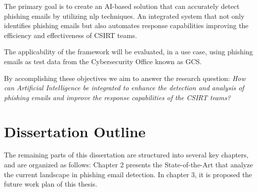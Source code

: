 The primary goal is to create an AI-based solution that can accurately detect phishing emails by utilizing \ac{nlp} techniques. An integrated system that not only identifies phishing emails but also automates response capabilities improving the efficiency and effectiveness of CSIRT teams.

The applicability of the framework will be evaluated, in a use case, using phishing emails as test data from the Cybersecurity Office known as GCS.


By accomplishing these objectives we aim to answer the research question:
\textit{How can Artificial Intelligence be integrated to enhance the detection and analysis of phishing emails and improve the response capabilities of the CSIRT teams?}

\section{Dissertation Outline}

The remaining parts of this dissertation are structured into several key chapters, and are organized as follows: Chapter 2 presents the State-of-the-Art that analyze the current landscape in phishing email detection. In chapter 3, it is proposed the future work plan of this thesis. 